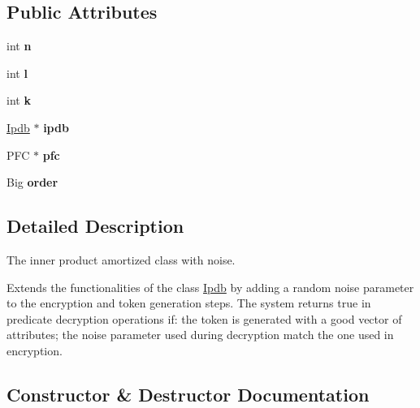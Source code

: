 \subsection*{Public Attributes}
\begin{DoxyCompactItemize}
\item 
int {\bfseries n}\hypertarget{classIpdbNoise_aab9d48df98df74e3f1b5931fd8e80e78}{}\label{classIpdbNoise_aab9d48df98df74e3f1b5931fd8e80e78}

\item 
int {\bfseries l}\hypertarget{classIpdbNoise_a587d074330c19ddebb80d4c33951ffaf}{}\label{classIpdbNoise_a587d074330c19ddebb80d4c33951ffaf}

\item 
int {\bfseries k}\hypertarget{classIpdbNoise_a26c8ce68145dc44b0d96461934a4181e}{}\label{classIpdbNoise_a26c8ce68145dc44b0d96461934a4181e}

\item 
\hyperlink{classIpdb}{Ipdb} $\ast$ {\bfseries ipdb}\hypertarget{classIpdbNoise_a8b68d4edaef45e6819de65e9268fe5a4}{}\label{classIpdbNoise_a8b68d4edaef45e6819de65e9268fe5a4}

\item 
P\+FC $\ast$ {\bfseries pfc}\hypertarget{classIpdbNoise_aae48ffb2a69eacaa0a9e9127e8c67f9c}{}\label{classIpdbNoise_aae48ffb2a69eacaa0a9e9127e8c67f9c}

\item 
Big {\bfseries order}\hypertarget{classIpdbNoise_a5d4ac29dd114058d89de4acacd68462a}{}\label{classIpdbNoise_a5d4ac29dd114058d89de4acacd68462a}

\end{DoxyCompactItemize}


\subsection{Detailed Description}
The inner product amortized class with noise. 

Extends the functionalities of the class \hyperlink{classIpdb}{Ipdb} by adding a random noise parameter to the encryption and token generation steps. The system returns true in predicate decryption operations if\+: the token is generated with a good vector of attributes; the noise parameter used during decryption match the one used in encryption. 

\subsection{Constructor \& Destructor Documentation}
